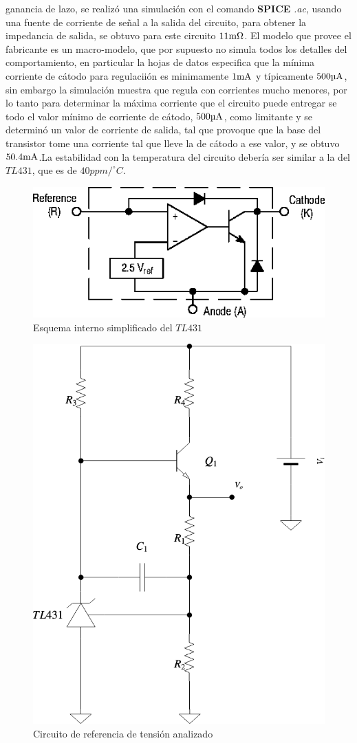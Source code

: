 ganancia de lazo, se realizó una simulación con el comando \textbf{SPICE} \textit{.ac}, usando una fuente de corriente de señal a la salida del circuito, para obtener la impedancia de salida, se obtuvo para este circuito $11 \si[per-mode=symbol]{\milli\ohm}$.
El modelo que provee el fabricante es un macro-modelo, que por supuesto no simula todos los detalles del comportamiento, en particular la hojas de datos especifica que la mínima corriente de cátodo para regulaciión es minimamente $1 \si[per-mode=symbol]{\milli\ampere}$ y típicamente $500 \si[per-mode=symbol]{\micro\ampere}$, sin embargo la simulación muestra que regula con corrientes mucho menores, por lo tanto para determinar la máxima corriente que el circuito puede entregar se todo el valor mínimo de corriente de cátodo, $500 \si[per-mode=symbol]{\micro\ampere}$, como limitante y se determinó un valor de corriente de salida, tal que provoque que la base del transistor tome una corriente tal que lleve la de cátodo a ese valor, y se obtuvo $50.4 \si[per-mode=symbol]{\milli\ampere}$.La estabilidad con la temperatura del circuito debería ser similar a la del $TL431$, que es de $40 ppm/^{\circ}C$.



\begin{figure}[H] %
\begin{center}
\includegraphics[width=0.65 \textwidth, angle=0]{./img/voltage_reference/reference2.png}
\end{center}
\caption{\label{fig:fig_vref_cir_2}\footnotesize{Esquema interno simplificado del $TL431$}}
\end{figure}



\begin{figure}[H] %
\begin{center}
\includegraphics[width=0.50 \textwidth, angle=0]{./img/voltage_reference/reference1.png}
\caption{\label{fig:fig_vref_cir_1}\footnotesize{Circuito de referencia de tensión analizado}}
\end{center}
\end{figure}



\clearpage
